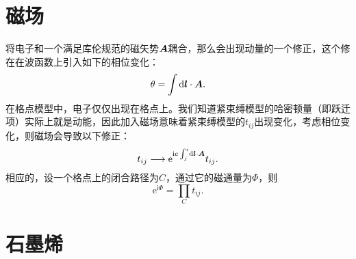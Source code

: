 \documentclass[hyperref, UTF8, a4paper]{ctexart}
\newcommand*{\ii}{\mathrm{i}}
\newcommand*{\ee}{\mathrm{e}}
\begin{document}
\section{磁场}

将电子和一个满足库伦规范的磁矢势$\vb*{A}$耦合，那么会出现动量的一个修正，这个修在在波函数上引入如下的相位变化：
\begin{equation}
    \theta = \int \dd{\vb*{l}} \cdot \vb*{A}.
\end{equation}
在格点模型中，电子仅仅出现在格点上。我们知道紧束缚模型的哈密顿量（即跃迁项）实际上就是动能，因此加入磁场意味着紧束缚模型的$t_{ij}$出现变化，考虑相位变化，则磁场会导致以下修正：
\begin{equation}
    t_{ij} \longrightarrow \ee^{\ii e \int_j^i \dd{\vb*{l}} \cdot \vb*{A} } t_{ij}.
\end{equation}
相应的，设一个格点上的闭合路径为$C$，通过它的磁通量为$\Phi$，则
\begin{equation}
    \ee^{\ii \Phi} = \prod_{C} t_{ij}.
\end{equation}

\section{石墨烯}
\end{document}
